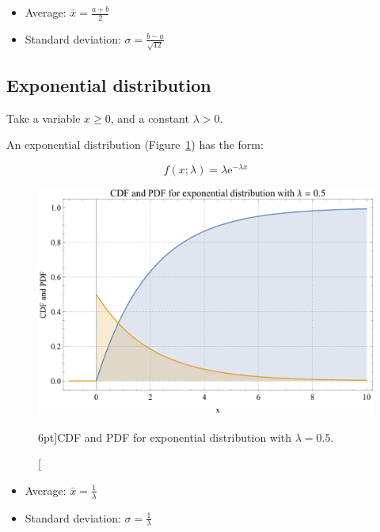 \begin{itemize}
	\item Average: $\bar{x} = \frac{a + b}{2}$
	\item Standard deviation: $\sigma = \frac{b - a}{\sqrt{12}}$
\end{itemize}

\subsection{Exponential distribution}
\label{subsec:expo_distr}

Take a variable $x \geq 0$, and a constant $\lambda > 0$.

An exponential distribution (Figure~\ref{fig:CDF_PDF_expo}) has the form:

\begin{equation}\label{eq:expo_distr}
	f(x ; \lambda) = \lambda \mathrm{e}^{- \lambda x}
\end{equation}

\begin{figure}
	\includegraphics{probability/CDF_PDF_expo.pdf}
	\caption[CDF and PDF for exponential distribution.][6pt]{CDF and PDF for exponential distribution with $\lambda = 0.5$.}
	\label{fig:CDF_PDF_expo}
\end{figure}

\begin{itemize}
	\item Average: $\bar{x} = \frac{1}{\lambda}$
	\item Standard deviation: $\sigma = \frac{1}{\lambda}$
\end{itemize}

